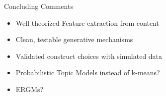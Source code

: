 \begin{frame}{{\color{violet}Concluding Comments}}

  \begin{itemize}
    \item Well-theorized Feature extraction from content
    \item Clean, testable generative mechanisms
    \item Validated construct choices with simulated data
    \item Probabilistic Topic Models instead of k-means?
    \item ERGMs?
  \end{itemize}

\end{frame}
